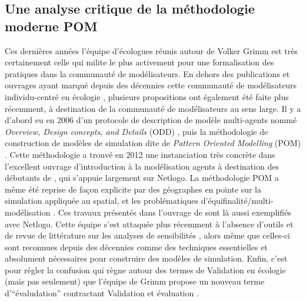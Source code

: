 \subsection{Une analyse critique de la méthodologie moderne POM}
\label{ssec:critique_pom}


Ces dernières années l'équipe d'écologues réunis autour de Volker Grimm est très certainement celle qui milite le plus activement pour une formalisation des pratiques dans la communauté de modélisateurs. En dehors des publications et ouvrages ayant marqué depuis des décennies cette communauté de modélisateurs individu-centré en écologie \autocites{Huston1988,DeAngelis1992,Grimm1999,Grimm2004,DeAngelis2014}, plusieurs propositions ont également été faite plus récemment, à destination de la communauté de modélisateurs au sens large. Il y a d'abord eu en 2006 d'un protocole de description de modèle multi-agents nommé \textit{Overview, Design concepts, and Details} (ODD) \autocite{Grimm2010}, puis la méthodologie de construction de modèles de simulation dite de \textit{Pattern Oriented Modelling} (POM) \autocites{Grimm2005}. Cette méthodologie a trouvé en 2012 une instanciation très concrète dans l'excellent ouvrage d'introduction à la modélisation agents à destination des débutants de \textcite{Railsback2012}, qui s'appuie largement sur Netlogo. La méthodologie POM a même été reprise de façon explicite par des géographes en pointe sur la simulation appliquée au spatial, et les problématiques d'équifinalité/multi-modélisation \autocite{OSullivan2004, Millington2012}. Ces travaux présentés dans l'ouvrage de \textcite{OSullivan2013} sont là aussi exemplifiés avec Netlogo. Cette équipe s'est attaquée plus récemment à l'absence d'outils et de revue de littérature sur les analyses de sensibilités \autocites{Thiele2012,Thiele2014}, alors même que celles-ci sont reconnues depuis des décennies comme des techniques essentielles et absolument nécessaires pour construire des modèles de simulation. Enfin, c'est pour régler la confusion qui règne autour des termes de Validation en écologie (mais pas seulement) que l'équipe de Grimm propose un nouveau terme d'\enquote{évaludation} contractant Validation et évaluation \autocite{Augusiak2014}. 

